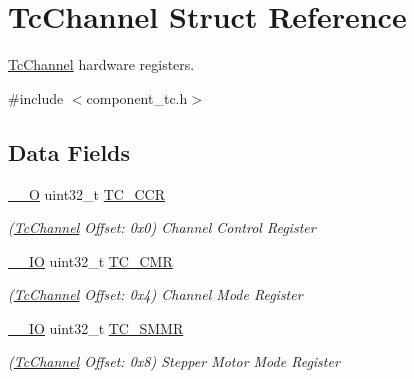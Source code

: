 \hypertarget{structTcChannel}{}\section{Tc\+Channel Struct Reference}
\label{structTcChannel}


\mbox{\hyperlink{structTcChannel}{Tc\+Channel}} hardware registers.  




{\ttfamily \#include $<$component\+\_\+tc.\+h$>$}

\subsection*{Data Fields}
\begin{DoxyCompactItemize}
\item 
\mbox{\label{structTcChannel_a7b9fca08998a1d909a742c783c6e905c}} 
\mbox{\hyperlink{core__cm7_8h_a7e25d9380f9ef903923964322e71f2f6}{\+\_\+\+\_\+O}} uint32\+\_\+t \mbox{\hyperlink{structTcChannel_a7b9fca08998a1d909a742c783c6e905c}{T\+C\+\_\+\+C\+CR}}
\begin{DoxyCompactList}\small\item\em (\mbox{\hyperlink{structTcChannel}{Tc\+Channel}} Offset\+: 0x0) Channel Control Register \end{DoxyCompactList}\item 
\mbox{\label{structTcChannel_a96b2c9af428494f405958aa13f790c32}} 
\mbox{\hyperlink{core__cm7_8h_aec43007d9998a0a0e01faede4133d6be}{\+\_\+\+\_\+\+IO}} uint32\+\_\+t \mbox{\hyperlink{structTcChannel_a96b2c9af428494f405958aa13f790c32}{T\+C\+\_\+\+C\+MR}}
\begin{DoxyCompactList}\small\item\em (\mbox{\hyperlink{structTcChannel}{Tc\+Channel}} Offset\+: 0x4) Channel Mode Register \end{DoxyCompactList}\item 
\mbox{\label{structTcChannel_a54b8af3c26551f31d667d9b1f3a58602}} 
\mbox{\hyperlink{core__cm7_8h_aec43007d9998a0a0e01faede4133d6be}{\+\_\+\+\_\+\+IO}} uint32\+\_\+t \mbox{\hyperlink{structTcChannel_a54b8af3c26551f31d667d9b1f3a58602}{T\+C\+\_\+\+S\+M\+MR}}
\begin{DoxyCompactList}\small\item\em (\mbox{\hyperlink{structTcChannel}{Tc\+Channel}} Offset\+: 0x8) Stepper Motor Mode Register \end{DoxyCompactList}\item 

\end{DoxyCompactItemize}

